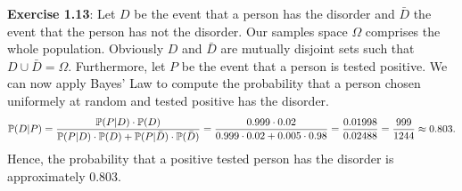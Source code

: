 \textbf{Exercise 1.13}:  Let $D$ be the event that a person has the disorder and
$\bar{D}$ the event that the person has not the disorder. Our samples space $\Omega$
comprises the whole population. Obviously $D$ and $\bar{D}$ are mutually disjoint
sets such that $D \cup \bar{D} = \Omega$. Furthermore, let $P$ be the event that
a person is tested positive. We can now apply Bayes' Law to compute the probability
that a person chosen uniformely at random and tested positive has the disorder.
\[
  \mathbb{P}(D|P)
    = \frac{\mathbb{P}(P|D) \cdot \mathbb{P}(D)}{\mathbb{P}(P|D) \cdot \mathbb{P}(D) + \mathbb{P}(P|\bar{D}) \cdot \mathbb{P}(\bar{D})}
    = \frac{0.999 \cdot 0.02}{0.999 \cdot 0.02 + 0.005 \cdot 0.98}
    = \frac{0.01998}{0.02488}
    = \frac{999}{1244}
    \approx 0.803.
\]
Hence, the probability that a positive tested person has the disorder is
approximately 0.803.
\\[0.5cm]
